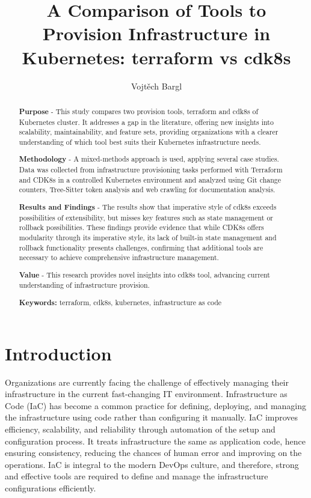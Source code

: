 \documentclass{article}
\author[1]{Vojtěch Bargl}
\affil[1]{University of Tomáš Baťa, Faculty of Faculty of Applied Informatics, Zlín, Czechia}
\title{A Comparison of Tools to Provision Infrastructure in Kubernetes: terraform vs cdk8s}
\begin{document}
\maketitle

\begin{abstract}
\textbf{Purpose} - This study compares two provision tools, terraform and cdk8s of Kubernetes cluster. It addresses a gap in the literature, offering new insights into scalability, maintainability, and feature sets, providing organizations with a clearer understanding of which tool best suits their Kubernetes infrastructure needs.

\textbf{Methodology} - A mixed-methods approach is used, applying several case studies. Data was collected from infrastructure provisioning tasks performed with Terraform and CDK8s in a controlled Kubernetes environment and analyzed using Git change counters, Tree-Sitter token analysis and web crawling for documentation analysis.

\textbf{Results and Findings} - The results show that imperative style of cdk8s exceeds possibilities of extensibility, but misses key features such as state management or rollback possibilities. These findings provide evidence that while CDK8s offers modularity through its imperative style, its lack of built-in state management and rollback functionality presents challenges, confirming that additional tools are necessary to achieve comprehensive infrastructure management.

\textbf{Value} - This research provides novel insights into cdk8s tool, advancing current understanding of infrastructure provision.

\textbf{Keywords:} terraform, cdk8s, kubernetes, infrastructure as code
\end{abstract}

\linenumbers

\section{Introduction}
\label{sec:introduction}


Organizations are currently facing the challenge of effectively managing their infrastructure in the current fast-changing IT environment. Infrastructure as Code (IaC) has become a common practice for defining, deploying, and managing the infrastructure using code rather than configuring it manually. IaC improves efficiency, scalability, and reliability through automation of the setup and configuration process. It treats infrastructure the same as application code, hence ensuring consistency, reducing the chances of human error and improving on the operations. IaC is integral to the modern DevOps culture, and therefore, strong and effective tools are required to define and manage the infrastructure configurations efficiently.
\end{document}

